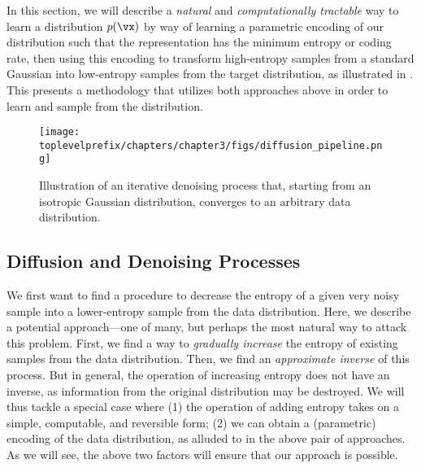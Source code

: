 \documentclass[../../book-main.tex]{subfiles}
\begin{document}
In this section, we will describe a \textit{natural} and \textit{computationally tractable} way to learn a distribution \(p(\vx)\) by way of learning a parametric encoding of our distribution such that the representation has the minimum entropy or coding rate, then using this encoding to transform high-entropy samples from a standard Gaussian into low-entropy samples from the target distribution, as illustrated in . This presents a methodology that utilizes both approaches above in order to learn and sample from the distribution.

\begin{figure}[t]
	\centering
	\texttt{[image: \\toplevelprefix/chapters/chapter3/figs/diffusion\_pipeline.png]}
	\caption{Illustration of an iterative denoising process that, starting from an isotropic Gaussian distribution, converges to an arbitrary data distribution. }
	\label{fig:diffusion-chapter3}
\end{figure}

\subsection{Diffusion and Denoising Processes} \label{sub:intro_diffusion_denoising}

We first want to find a procedure to decrease the entropy of a given very noisy sample into a lower-entropy sample from the data distribution. Here, we describe a potential approach---one of many, but perhaps the most natural way to attack this problem. First, we find a way to \textit{gradually increase} the entropy of existing samples from the data distribution. Then, we find an \textit{approximate inverse} of this process. But in general, the operation of increasing entropy does not have an inverse, as information from the original distribution may be destroyed. We will thus tackle a special case where (1) the operation of adding entropy takes on a simple, computable, and reversible form; (2) we can obtain a (parametric) encoding of the data distribution, as alluded to in the above pair of approaches. As we will see, the above two factors will ensure that our approach is possible.
\end{document}
